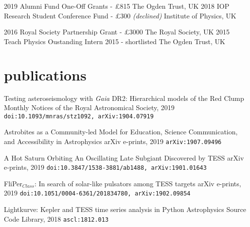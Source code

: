 \documentclass[]{k-cv} %
\begin{document}
\begin{entrylist}
\entrythree
{2019}
{Alumni Fund One-Off Grants - \pounds 815}
{The Ogden Trust, UK}
\entrythree
{2018}
{IOP Research Student Conference Fund - \pounds 300 \emph{(declined)}}
{Institute of Physics, UK}

\entrythree
{2016}
{Royal Society Partnership Grant - \pounds 3000}
{The Royal Society, UK}
\entrythree
{2015}
{Teach Physics Oustanding Intern 2015 - shortlisted}
{The Ogden Trust, UK}

\end{entrylist}

\section{publications}
{Testing asteroseismology with \textit{Gaia} DR2: Hierarchical models of the Red Clump}
{Monthly Notices of the Royal Astronomical Society, 2019}
{\texttt{doi:10.1093/mnras/stz1092, arXiv:1904.07919}}

{Astrobites as a Community-led Model for Education, Science Communication, and Accessibility in Astrophysics}
{arXiv e-prints, 2019}
{\texttt{arXiv:1907.09496}}

{{A Hot Saturn Orbiting An Oscillating Late Subgiant Discovered by TESS}}
{arXiv e-prints, 2019}
{\texttt{doi:10.3847/1538-3881/ab1488, arXiv:1901.01643}}

{FliPer$_{Class}$: In search of solar-like pulsators among TESS targets}
{arXiv e-prints, 2019}
{\texttt{doi:10.1051/0004-6361/201834780, arXiv:1902.09854}}

{Lightkurve: Kepler and TESS time series analysis in Python}
{Astrophysics Source Code Library, 2018}
{\texttt{ascl:1812.013}}
\end{document}
